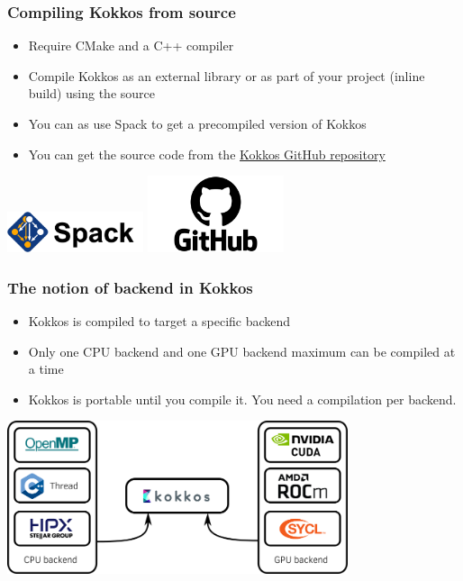 \documentclass[aspectratio=169]{beamer}
\begin{document}
\begin{frame}
    \frametitle{Compiling Kokkos from source} 
    \begin{itemize}
        \item Require CMake and a C++ compiler
        \item Compile Kokkos as an external library or as part of your project (inline build) using the source
        \item You can as use Spack to get a precompiled version of Kokkos
        \item You can get the source code from the \href{https://github.com/kokkos/kokkos}{Kokkos GitHub repository}
    \end{itemize}

    \hspace{1cm}

    \centering
    \includegraphics[width=0.3\textwidth]{../../images/spack.png}
    \includegraphics[width=0.3\textwidth]{../../images/GitHub-logo.png}

\end{frame}


\begin{frame}
    \frametitle{The notion of backend in Kokkos} 
    \begin{itemize}
        \item Kokkos is compiled to target a specific backend
        \item Only one CPU backend and one GPU backend maximum can be compiled at a time
        \item Kokkos is portable until you compile it. You need a compilation per backend.
    \end{itemize}

    \hspace{1cm}

    \centering
    \includegraphics[width=0.75\textwidth]{../../images/kokkos_backend.png}

\end{frame}
\end{document}
